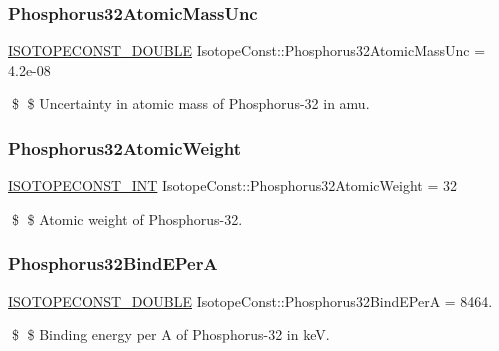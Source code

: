 \subsubsection{\texorpdfstring{Phosphorus32\+Atomic\+Mass\+Unc}{Phosphorus32AtomicMassUnc}}
{\footnotesize\ttfamily \mbox{\hyperlink{group___isotope_const-_macros_ga8f45a7272ce02c0b4c65c44636ed719a}{I\+S\+O\+T\+O\+P\+E\+C\+O\+N\+S\+T\+\_\+\+D\+O\+U\+B\+LE}} Isotope\+Const\+::\+Phosphorus32\+Atomic\+Mass\+Unc = 4.\+2e-\/08}

\$ \$ Uncertainty in atomic mass of Phosphorus-\/32 in amu. \mbox{\label{group___isotope_const-_phosphorus-_p32_ga9578ac6acf4a43f05041903554015cca}} 
\subsubsection{\texorpdfstring{Phosphorus32\+Atomic\+Weight}{Phosphorus32AtomicWeight}}
{\footnotesize\ttfamily \mbox{\hyperlink{group___isotope_const-_macros_ga5f18360b3e99483a35c32d789e62621c}{I\+S\+O\+T\+O\+P\+E\+C\+O\+N\+S\+T\+\_\+\+I\+NT}} Isotope\+Const\+::\+Phosphorus32\+Atomic\+Weight = 32}

\$ \$ Atomic weight of Phosphorus-\/32. \mbox{\label{group___isotope_const-_phosphorus-_p32_gaf4448ad119a6e27c05e968ddeb24dac7}} 
\subsubsection{\texorpdfstring{Phosphorus32\+Bind\+E\+PerA}{Phosphorus32BindEPerA}}
{\footnotesize\ttfamily \mbox{\hyperlink{group___isotope_const-_macros_ga8f45a7272ce02c0b4c65c44636ed719a}{I\+S\+O\+T\+O\+P\+E\+C\+O\+N\+S\+T\+\_\+\+D\+O\+U\+B\+LE}} Isotope\+Const\+::\+Phosphorus32\+Bind\+E\+PerA = 8464.}

\$ \$ Binding energy per A of Phosphorus-\/32 in keV. \mbox{\label{group___isotope_const-_phosphorus-_p32_ga9a51d8db309dab392c40f577ca3515db}} 
